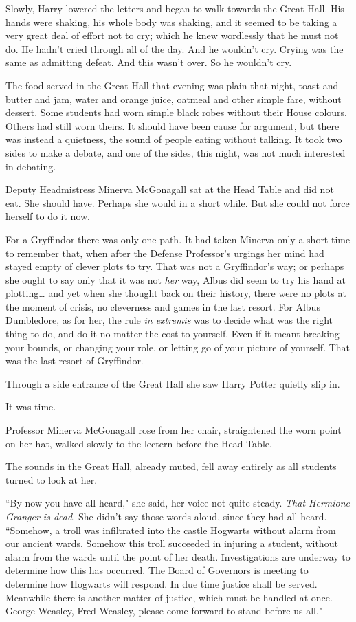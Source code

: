 Slowly, Harry lowered the letters and began to walk towards the Great Hall. His hands were shaking, his whole body was shaking, and it seemed to be taking a very great deal of effort not to cry; which he knew wordlessly that he must not do. He hadn't cried through all of the day. And he wouldn't cry. Crying was the same as admitting defeat. And this wasn't over. So he wouldn't cry.

\later

The food served in the Great Hall that evening was plain that night, toast and butter and jam, water and orange juice, oatmeal and other simple fare, without dessert. Some students had worn simple black robes without their House colours. Others had still worn theirs. It should have been cause for argument, but there was instead a quietness, the sound of people eating without talking. It took two sides to make a debate, and one of the sides, this night, was not much interested in debating.

Deputy Headmistress Minerva McGonagall sat at the Head Table and did not eat. She should have. Perhaps she would in a short while. But she could not force herself to do it now.

For a Gryffindor there was only one path. It had taken Minerva only a short time to remember that, when after the Defense Professor's urgings her mind had stayed empty of clever plots to try. That was not a Gryffindor's way; or perhaps she ought to say only that it was not \emph{her} way, Albus did seem to try his hand at plotting{\ldots} and yet when she thought back on their history, there were no plots at the moment of crisis, no cleverness and games in the last resort. For Albus Dumbledore, as for her, the rule \emph{in extremis} was to decide what was the right thing to do, and do it no matter the cost to yourself. Even if it meant breaking your bounds, or changing your role, or letting go of your picture of yourself. That was the last resort of Gryffindor.

Through a side entrance of the Great Hall she saw Harry Potter quietly slip in.

It was time.

Professor Minerva McGonagall rose from her chair, straightened the worn point on her hat, walked slowly to the lectern before the Head Table.

The sounds in the Great Hall, already muted, fell away entirely as all students turned to look at her.

``By now you have all heard," she said, her voice not quite steady. \emph{That Hermione Granger is dead.} She didn't say those words aloud, since they had all heard. ``Somehow, a troll was infiltrated into the castle Hogwarts without alarm from our ancient wards. Somehow this troll succeeded in injuring a student, without alarm from the wards until the point of her death. Investigations are underway to determine how this has occurred. The Board of Governors is meeting to determine how Hogwarts will respond. In due time justice shall be served. Meanwhile there is another matter of justice, which must be handled at once. George Weasley, Fred Weasley, please come forward to stand before us all."

